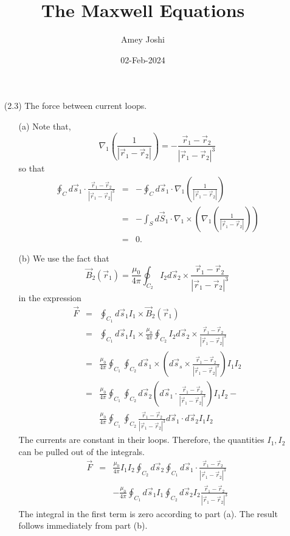 \documentclass{article}
\title{The Maxwell Equations}\label{c2}
\author{Amey Joshi}
\date{02-Feb-2024}
\begin{document}
\maketitle
\begin{enumerate}
\item[(2.3)] The force between current loops.
\begin{enumerate}
\item[(a)] Note that,
\[
\nabla_1\left(\frac{1}{|\vec{r}_1 - \vec{r}_2|}\right) = -\frac{\vec{r}_1 - \vec{r}_2}{|\vec{r}_1 - \vec{r}_2|^3}
\]
so that
\begin{eqnarray*}
\oint_C d\vec{s}_1\cdot\frac{\vec{r}_1 - \vec{r}_2}{|\vec{r}_1 - \vec{r}_2|^3}
 &=& -\oint_C d\vec{s}_1\cdot\nabla_1\left(\frac{1}{|\vec{r}_1 - \vec{r}_2|}\right) \\
 &=& -\int_S d\vec{S}_1\cdot\nabla_1\times\left(\nabla_1\left(\frac{1}{|\vec{r}_1 - \vec{r}_2|}\right)\right)\\
 &=& 0.
\end{eqnarray*}

\item[(b)] We use the fact that
\[
\vec{B}_2(\vec{r}_1) = \frac{\mu_0}{4\pi}\oint_{C_2} I_2d\vec{s}_2 \times \frac{\vec{r}_1 - \vec{r}_2}{|\vec{r}_1 - \vec{r}_2|^3}
\]
in the expression
\begin{eqnarray*}
\vec{F} &=& \oint_{C_1}d\vec{s}_1 I_1 \times \vec{B}_2(\vec{r}_1) \\
 &=& \oint_{C_1}d\vec{s}_1I_1 \times \frac{\mu_0}{4\pi}\oint_{C_2} 
 	I_2d\vec{s}_2 \times \frac{\vec{r}_1 - \vec{r}_2}{|\vec{r}_1 - \vec{r}_2|^3} \\
 &=& \frac{\mu_0}{4\pi}\oint_{C_1}\oint_{C_2}d\vec{s}_1\times\left(d\vec{s}_s\times
        \frac{\vec{r}_1 - \vec{r}_2}{|\vec{r}_1 - \vec{r}_2|^3}\right)I_1I_2 \\
 &=& \frac{\mu_0}{4\pi}\oint_{C_1}\oint_{C_2}d\vec{s}_2\left(d\vec{s}_1\cdot
        \frac{\vec{r}_1 - \vec{r}_2}{|\vec{r}_1 - \vec{r}_2|^3}\right)I_1I_2  - \\
 & &  \frac{\mu_0}{4\pi}\oint_{C_1}\oint_{C_2}\frac{\vec{r}_1 - \vec{r}_2}{|\vec{r}_1 - \vec{r}_2|^3}
      d\vec{s}_1 \cdot d\vec{s}_2 I_1I_2
\end{eqnarray*}
The currents are constant in their loops. Therefore, the quantities $I_1, I_2$ 
can be pulled out of the integrals.
\begin{eqnarray*}
\vec{F} &=& \frac{\mu_0}{4\pi}I_1I_2\oint_{C_2}d\vec{s}_2\oint_{C_1}d\vec{s}_1\cdot
        \frac{\vec{r}_1 - \vec{r}_2}{|\vec{r}_1 - \vec{r}_2|^3} \\
 & & -\frac{\mu_0}{4\pi}\oint_{C_1}d\vec{s}_1I_1\oint_{C_2}d\vec{s}_2 I_2\frac{\vec{r}_1 - \vec{r}_2}{|\vec{r}_1 - \vec{r}_2|^3}
\end{eqnarray*}
The integral in the first term is zero according to part (a). The result
follows immediately from part (b).
\end{enumerate}


\end{enumerate}
\end{document}
